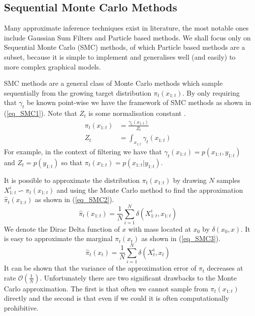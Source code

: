 \documentclass[../masters.tex]{subfiles}
\begin{document}
\subsection{Sequential Monte Carlo Methods}
Many approximate inference techniques exist in literature, the most notable ones include Gaussian Sum Filters \cite{gsf1} and Particle based methods. We shall focus only on Sequential Monte Carlo (SMC) methods, of which Particle based methods are a subset, because it is simple to implement and generalises well (and easily) to more complex graphical models. 

SMC methods are a general class of Monte Carlo methods which sample sequentially from the growing target distribution $\pi_t(x_{1:t})$. By only requiring that $\gamma_t$ be known point-wise we have the framework of SMC methods as shown in (\ref{eq_SMC1}). Note that $Z_t$ is some normalisation constant \cite{pftut}.
\begin{equation}
\begin{aligned}
\pi_t(x_{1:t}) &= \frac{\gamma_t(x_{1:t})}{Z_t} \\
Z_t &= \int_{x_{1:t}} \gamma_t(x_{1:t})
\end{aligned}
\label{eq_SMC1}
\end{equation} 
For example, in the context of filtering we have that $\gamma_t(x_{1:t}) = p(x_{1:t},y_{1:t})$ and $Z_t = p(y_{1:t})$ so that $\pi_t(x_{1:t}) = p(x_{1:t}|y_{1:t})$. 

It is possible to approximate the distribution $\pi_t(x_{1:t})$ by drawing $N$ samples $X_{1:t}^i \backsim \pi_t(x_{1:t})$ and using the Monte Carlo method to find the approximation $\hat{\pi}_t(x_{1:t})$ as shown in (\ref{eq_SMC2}).
\begin{equation}
\hat{\pi}_t(x_{1:t}) = \frac{1}{N}\sum_{i=1}^N \delta(X^i_{1:t}, x_{1:t})
\label{eq_SMC2}
\end{equation}
We denote the Dirac Delta function of $x$ with mass located at $x_0$ by $\delta(x_0,x)$. It is easy to approximate the marginal $\pi_t(x_{t})$ as shown in (\ref{eq_SMC3}).
\begin{equation}
\hat{\pi}_t(x_{t}) = \frac{1}{N}\sum_{i=1}^N \delta(X^i_{t}, x_{t})
\label{eq_SMC3}
\end{equation}
It can be shown that the variance of the approximation error of $\pi_t$ decreases at rate $\mathcal{O}(\frac{1}{N})$. Unfortunately there are two significant drawbacks to the Monte Carlo approximation. The first is that often we cannot sample from $\pi_t(x_{1:t})$ directly and the second is that even if we could it is often computationally prohibitive. 
\end{document}
